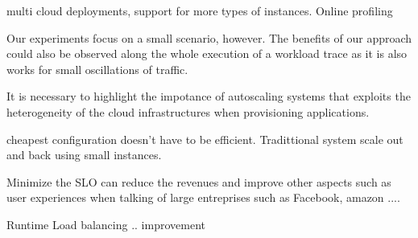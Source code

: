 \label{sec:conclusion}

multi cloud deployments, support for more types of instances.
Online profiling

Our experiments focus on a small scenario, however. The benefits of our approach could also be observed along the whole execution of a workload trace as it is also works for small oscillations of traffic.

It is necessary to highlight the impotance of autoscaling systems that exploits the heterogeneity of the cloud infrastructures when provisioning applications.

cheapest configuration doesn't have to be efficient. Tradittional system scale out and back using small instances.

Minimize the SLO can reduce the revenues and improve other aspects such as user experiences when talking of large entreprises such as Facebook, amazon ....

Runtime Load balancing .. improvement
